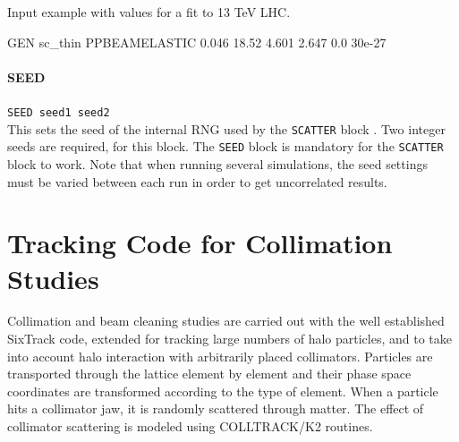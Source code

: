 Input example with values for a fit to 13 TeV LHC.
\begin{cverbatim}
GEN  sc_thin     PPBEAMELASTIC 0.046 18.52 4.601 2.647 0.0 30e-27
\end{cverbatim}

\paragraph{SEED} \texttt{SEED seed1 seed2}\\

This sets the seed of the internal RNG used by the \texttt{SCATTER} block \cite{RANECU}.
Two integer seeds are required, for this block.
The \texttt{SEED} block is mandatory for the \texttt{SCATTER} block to work.
Note that when running several simulations, the seed settings must be varied between each run in order to get uncorrelated results.

\section{Tracking Code for Collimation Studies} \label{sec:collimat}

Collimation and beam cleaning studies are carried out with the well established SixTrack code, extended for tracking large numbers of halo particles, and to take into account halo interaction with arbitrarily placed collimators.
Particles are transported through the lattice element by element and their phase space coordinates are transformed according to the type of element. When a particle hits a collimator jaw, it is randomly scattered through matter.
The effect of collimator scattering is modeled using COLLTRACK/K2 \cite{collimat:trenkler,collimat:robert_demolaize} routines.

